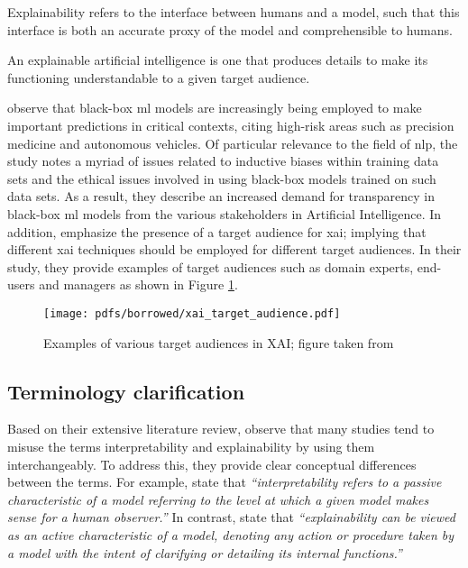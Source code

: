 \begin{definition}
  Explainability refers to the interface between humans and a model, such that
  this interface is both an accurate proxy of the model and comprehensible to
  humans.
\end{definition}

\begin{definition}
  An explainable artificial intelligence is one that produces details to make
  its functioning understandable to a given target audience.
\end{definition}

\citet{arrieta2020explainable} observe that black-box \ac{ml} models are
increasingly being employed to make important predictions in critical contexts,
citing high-risk areas such as precision medicine and autonomous vehicles. Of
particular relevance to the field of \ac{nlp}, the
study notes a myriad of issues related to inductive biases within training data
sets and the ethical issues involved in using black-box models trained on such
data sets. As a result, they describe an increased demand for transparency in
black-box \ac{ml} models from the various stakeholders in Artificial
Intelligence. In addition, \citet{arrieta2020explainable} emphasize the presence
of a target audience for \ac{xai}; implying that different \ac{xai} techniques
should be employed for different target audiences. In their study, they provide
examples of target audiences such as domain experts, end-users and managers as
shown in Figure \ref{fig:xai_target_audience}.

\begin{figure}[t]
  \centering \texttt{[image: pdfs/borrowed/xai\_target\_audience.pdf]}
  \caption{Examples of various target audiences in XAI; figure taken from
    \citet{arrieta2020explainable}}
  \label{fig:xai_target_audience}
\end{figure}

\subsection{Terminology clarification}

\label{section:xai_terminology}

Based on their extensive literature review, \citet{arrieta2020explainable}
observe that many studies tend to misuse the terms interpretability and
explainability by using them interchangeably. To address this, they provide
clear conceptual differences between the terms. For example, \citet[Page 3,
Section 2.1]{arrieta2020explainable} state that \textit{``interpretability
  refers to a passive characteristic of a model referring to the level at which
  a given model makes sense for a human observer.''} In contrast, \citet[Page 3,
Section 2.1]{arrieta2020explainable} state that \textit{``explainability can be
  viewed as an active characteristic of a model, denoting any action or
  procedure taken by a model with the intent of clarifying or detailing its
  internal functions.''}


